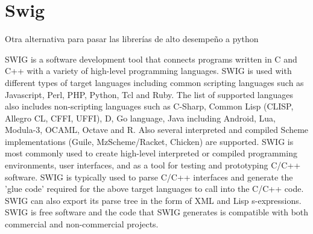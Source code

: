 \section{Swig}

Otra alternativa para pasar las librerías de alto desempeño a python

SWIG is a software development tool that connects programs written in
C and C++ with a variety of high-level programming languages. SWIG is
used with different types of target languages including common
scripting languages such as Javascript, Perl, PHP, Python, Tcl and
Ruby. The list of supported languages also includes non-scripting
languages such as C-Sharp, Common Lisp (CLISP, Allegro CL, CFFI, UFFI), D,
Go language, Java including Android, Lua, Modula-3, OCAML, Octave and
R. Also several interpreted and compiled Scheme implementations
(Guile, MzScheme/Racket, Chicken) are supported. SWIG is most commonly
used to create high-level interpreted or compiled programming
environments, user interfaces, and as a tool for testing and
prototyping C/C++ software. SWIG is typically used to parse C/C++
interfaces and generate the 'glue code' required for the above target
languages to call into the C/C++ code. SWIG can also export its parse
tree in the form of XML and Lisp s-expressions. SWIG is free software
and the code that SWIG generates is compatible with both commercial
and non-commercial projects.